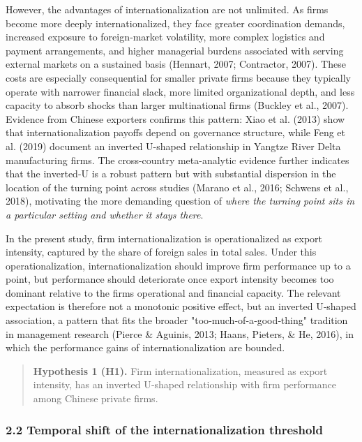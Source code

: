 \documentclass[12pt,a4paper]{article}
\begin{document}
However, the advantages of internationalization are not unlimited. As
firms become more deeply internationalized, they face greater
coordination demands, increased exposure to foreign‑market volatility,
more complex logistics and payment arrangements, and higher managerial
burdens associated with serving external markets on a sustained basis
(Hennart, 2007; Contractor, 2007). These costs are especially
consequential for smaller private firms because they typically operate
with narrower financial slack, more limited organizational depth, and
less capacity to absorb shocks than larger multinational firms (Buckley
et al., 2007). Evidence from Chinese exporters confirms this pattern:
Xiao et al. (2013) show that internationalization payoffs depend on
governance structure, while Feng et al. (2019) document an inverted
U-shaped relationship in Yangtze River Delta manufacturing firms. The
cross-country meta-analytic evidence further indicates that the
inverted-U is a robust pattern but with substantial dispersion in the
location of the turning point across studies (Marano et al., 2016;
Schwens et al., 2018), motivating the more demanding question of
\emph{where the turning point sits in a particular setting and whether
it stays there}.

In the present study, firm internationalization is operationalized as
export intensity, captured by the share of foreign sales in total sales.
Under this operationalization, internationalization should improve firm
performance up to a point, but performance should deteriorate once
export intensity becomes too dominant relative to the
firm\textquotesingle s operational and financial capacity. The relevant
expectation is therefore not a monotonic positive effect, but an
inverted U‑shaped association, a pattern that fits the broader
"too‑much‑of‑a‑good‑thing" tradition in management research (Pierce \&
Aguinis, 2013; Haans, Pieters, \& He, 2016), in which the performance
gains of internationalization are bounded.

\begin{quote}
\textbf{Hypothesis 1 (H1).} Firm internationalization, measured as
export intensity, has an inverted U‑shaped relationship with firm
performance among Chinese private firms.
\end{quote}

\hypertarget{22-temporal-shift-of-the-internationalization-threshold}{%
\subsubsection{2.2 Temporal shift of the internationalization
threshold}\label{22-temporal-shift-of-the-internationalization-threshold}}
\end{document}
